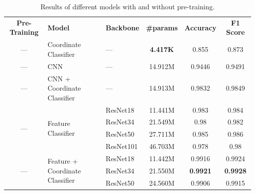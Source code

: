 \documentclass{article}
\begin{document}
\begin{table}[!htp]\centering
  \caption{Results of different models with and without pre-training.}\label{tab:global_results}
  \scriptsize
  \begin{tabular}{cllccc}\toprule
    \textbf{Pre-Training}             & \textbf{Model}                                   & \textbf{Backbone}           & \textbf{\#params} & \textbf{Accuracy} & \textbf{F1 Score} \\ \cmidrule{1-6}
    ---                               & Coordinate Classifier                            & ---                         & \textbf{4.417K}   & 0.855             & 0.873             \\ \cmidrule{1-6}
    ---                               & CNN                                              & ---                         & 14.912M           & 0.9446            & 0.9491            \\ \cmidrule{1-6}
    ---                               & CNN + Coordinate Classifier                      & ---                         & 14.913M           & 0.9832            & 0.9849            \\ \cmidrule{1-6}
    \multirow{4}{*}{---}              & \multirow{4}{*}{Feature Classifier}              & ResNet18                    & 11.441M           & 0.983             & 0.984             \\
                                      &                                                  & ResNet34                    & 21.549M           & 0.98              & 0.982             \\
                                      &                                                  & ResNet50                    & 27.711M           & 0.985             & 0.986             \\
                                      &                                                  & ResNet101                   & 46.703M           & 0.978             & 0.98              \\ \cmidrule{1-6}
    \multirow{4}{*}{---}              & \multirow{4}{*}{Feature + Coordinate Classifier} & ResNet18                    & 11.442M           & 0.9916            & 0.9924            \\
                                      &                                                  & ResNet34                    & 21.550M           & \textbf{0.9921}   & \textbf{0.9928}   \\
                                      &                                                  & ResNet50                    & 24.560M           & 0.9906            & 0.9915            \\

\end{tabular}
\end{table}
\end{document}
